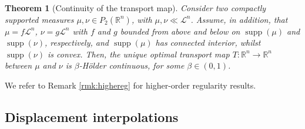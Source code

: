 \documentclass[reqno]{amsart}
\DeclareMathOperator{\supp}{supp}
\theoremstyle{plain}
\newtheorem{thm}{Theorem}[section]
\theoremstyle{definition}
\theoremstyle{remark}
\begin{document}
	
	\begin{thm}[Continuity of the transport map]
		 Consider two compactly supported measures $\mu, \nu\in P_2(\mathbb{R}^n)$, with $\mu, \nu\ll\mathscr{L}^n$. Assume, in addition, that $\mu=f\mathscr{L}^n$, $\nu=g\mathscr{L}^n$ with $f$ and $g$ bounded from above and below on $\supp(\mu)$ and $\supp(\nu)$, respectively, and $\supp(\mu)$ has connected interior, whilst $\supp(\nu)$ is convex. Then, the unique optimal transport map $T:\mathbb{R}^n\to\mathbb{R}^n$ between $\mu$ and $\nu$ is $\beta$-Hölder continuous, for some $\beta\in(0,1)$.
	\end{thm}

    We refer to Remark \ref{rmk:highereg} for higher-order regularity results.

    \subsection{Displacement interpolations}
    
\end{document}
